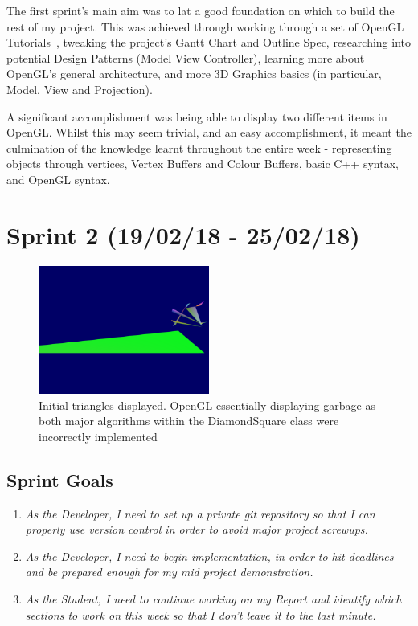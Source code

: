\documentclass[a4paper,10pt]{report}
\begin{document}
The first sprint's main aim was to lat a good foundation on which to build the rest of my project. This was achieved through working through a set of OpenGL Tutorials~\cite{opengl_tutorial}, tweaking the project's Gantt Chart and Outline Spec, researching into potential Design Patterns (Model View Controller), learning more about OpenGL's general architecture, and more 3D Graphics basics (in particular, Model, View and Projection). \medskip

A significant accomplishment was being able to display two different items in OpenGL. Whilst this may seem trivial, and an easy accomplishment, it meant the culmination of the knowledge learnt throughout the entire week - representing objects through vertices, Vertex Buffers and Colour Buffers, basic C++ syntax, and OpenGL syntax.\medskip

\clearpage
\section{Sprint 2 (19/02/18 - 25/02/18)}

\begin{figure}[h!]
    \centering
  \includegraphics[width=0.5\textwidth]{Sprint2-1.png}
 \caption{Initial triangles displayed. OpenGL essentially displaying garbage as both major algorithms within the DiamondSquare class were incorrectly implemented}
 \label{fig:sprint2-1}
\end{figure}

\subsection{Sprint Goals}
\begin{enumerate}
    \item \textit{As the Developer, I need to set up a private git repository so that I can properly use version control in order to avoid major project screwups.
    }
    \item \textit{As the Developer, I need to begin implementation, in order to hit deadlines and be prepared enough for my mid project demonstration.}
    \item\textit{As the Student, I need to continue working on my Report and identify which sections to work on this week so that I don't leave it to the last minute.}
    
\end{enumerate}
\end{document}

